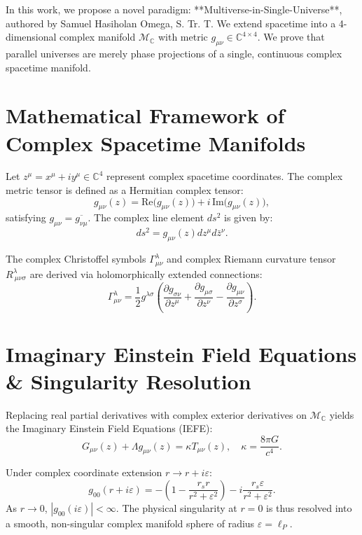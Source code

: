 \documentclass[journal,twocolumn]{IEEEtran}
\begin{document}
In this work, we propose a novel paradigm: **Multiverse-in-Single-Universe**, authored by Samuel Hasiholan Omega, S. Tr. T. We extend spacetime into a 4-dimensional complex manifold $\mathcal{M}_{\mathbb{C}}$ with metric $g_{\mu\nu} \in \mathbb{C}^{4\times 4}$. We prove that parallel universes are merely phase projections of a single, continuous complex spacetime manifold.

\section{Mathematical Framework of Complex Spacetime Manifolds}
Let $z^\mu = x^\mu + i y^\mu \in \mathbb{C}^4$ represent complex spacetime coordinates. The complex metric tensor is defined as a Hermitian complex tensor:
\begin{equation}
g_{\mu\nu}(z) = \text{Re}\big(g_{\mu\nu}(z)\big) + i \, \text{Im}\big(g_{\mu\nu}(z)\big),
\end{equation}
satisfying $g_{\mu\nu} = \overline{g_{\nu\mu}}$. The complex line element $ds^2$ is given by:
\begin{equation}
ds^2 = g_{\mu\nu}(z) dz^\mu d\bar{z}^\nu.
\end{equation}

The complex Christoffel symbols $\Gamma^\lambda_{\mu\nu}$ and complex Riemann curvature tensor $R^\lambda_{\:\mu\nu\sigma}$ are derived via holomorphically extended connections:
\begin{equation}
\Gamma^\lambda_{\mu\nu} = \frac{1}{2} g^{\lambda\sigma} \left( \frac{\partial g_{\sigma\nu}}{\partial z^\mu} + \frac{\partial g_{\mu\sigma}}{\partial z^\nu} - \frac{\partial g_{\mu\nu}}{\partial z^\sigma} \right).
\end{equation}

\section{Imaginary Einstein Field Equations \& Singularity Resolution}
Replacing real partial derivatives with complex exterior derivatives on $\mathcal{M}_{\mathbb{C}}$ yields the Imaginary Einstein Field Equations (IEFE):
\begin{equation}
G_{\mu\nu}(z) + \Lambda g_{\mu\nu}(z) = \kappa T_{\mu\nu}(z), \quad \kappa = \frac{8\pi G}{c^4}.
\end{equation}

Under complex coordinate extension $r \to r + i \varepsilon$:
\begin{equation}
g_{00}(r + i \varepsilon) = -\left(1 - \frac{r_s r}{r^2 + \varepsilon^2}\right) - i \frac{r_s \varepsilon}{r^2 + \varepsilon^2}.
\end{equation}
As $r \to 0$, $|g_{00}(i\varepsilon)| < \infty$. The physical singularity at $r=0$ is thus resolved into a smooth, non-singular complex manifold sphere of radius $\varepsilon = \ell_P$.
\end{document}
